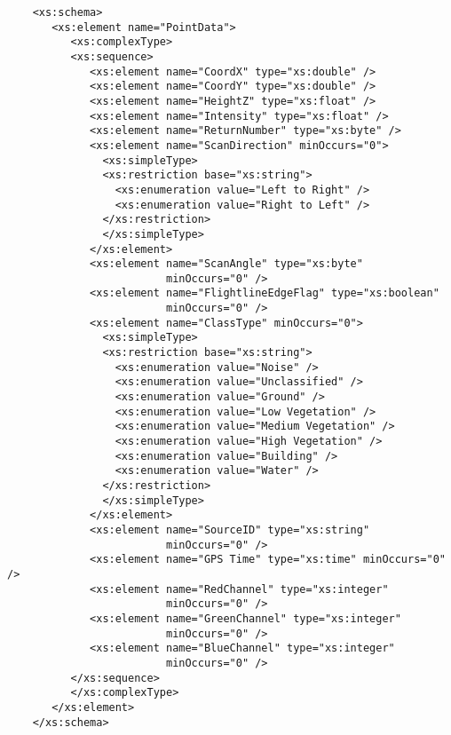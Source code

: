    \noindent
   \begin{verbatim}
    <xs:schema>
       <xs:element name="PointData">
          <xs:complexType>
          <xs:sequence>
             <xs:element name="CoordX" type="xs:double" />
             <xs:element name="CoordY" type="xs:double" />
             <xs:element name="HeightZ" type="xs:float" />
             <xs:element name="Intensity" type="xs:float" />
             <xs:element name="ReturnNumber" type="xs:byte" />
             <xs:element name="ScanDirection" minOccurs="0">
               <xs:simpleType>
               <xs:restriction base="xs:string">
                 <xs:enumeration value="Left to Right" />
                 <xs:enumeration value="Right to Left" />
               </xs:restriction>
               </xs:simpleType>
             </xs:element>
             <xs:element name="ScanAngle" type="xs:byte"
                         minOccurs="0" />
             <xs:element name="FlightlineEdgeFlag" type="xs:boolean"
                         minOccurs="0" />
             <xs:element name="ClassType" minOccurs="0">
               <xs:simpleType>
               <xs:restriction base="xs:string">
                 <xs:enumeration value="Noise" />
                 <xs:enumeration value="Unclassified" />
                 <xs:enumeration value="Ground" />
                 <xs:enumeration value="Low Vegetation" />
                 <xs:enumeration value="Medium Vegetation" />
                 <xs:enumeration value="High Vegetation" />
                 <xs:enumeration value="Building" />
                 <xs:enumeration value="Water" />
               </xs:restriction>
               </xs:simpleType>
             </xs:element>
             <xs:element name="SourceID" type="xs:string"
                         minOccurs="0" />
             <xs:element name="GPS Time" type="xs:time" minOccurs="0" />
             <xs:element name="RedChannel" type="xs:integer"
                         minOccurs="0" />
             <xs:element name="GreenChannel" type="xs:integer"
                         minOccurs="0" />
             <xs:element name="BlueChannel" type="xs:integer"
                         minOccurs="0" />
          </xs:sequence>
          </xs:complexType>
       </xs:element>
    </xs:schema>
\end{verbatim}

